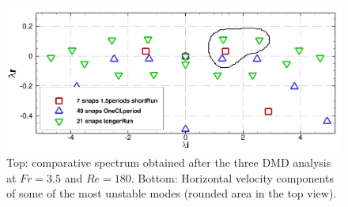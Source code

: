 \begin{figure}[ht]
  \centering
  \includegraphics[width=0.95\columnwidth]{images_10thspheric/7vs40vslongersnaps.jpg}
  \caption{Top: comparative spectrum obtained after the three DMD analysis at $Fr=3.5$ and $Re=180$. Bottom: Horizontal velocity components of some of the most unstable modes (rounded area in the top view).}
  \label{fg:DMDglobal}
\end{figure}

